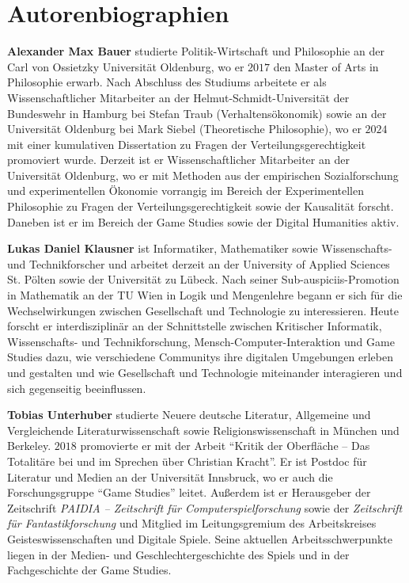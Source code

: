 \documentclass{scrartcl}
\begin{document}
\clearpage
\section*{Autorenbiographien}
\textbf{\textsf{Alexander Max Bauer}} studierte Politik-Wirtschaft und Philosophie an der Carl von Ossietzky Universität Oldenburg, wo er $2017$ den Master of Arts in Philosophie erwarb.
Nach Abschluss des Studiums arbeitete er als Wissenschaftlicher Mitarbeiter an der Helmut-Schmidt-Universität der Bundeswehr in Hamburg bei Stefan Traub (Verhaltensökonomik) sowie an der Universität Oldenburg bei Mark Siebel (Theoretische Philosophie), wo er $2024$ mit einer kumulativen Dissertation zu Fragen der Verteilungsgerechtigkeit promoviert wurde.
Derzeit ist er Wissenschaftlicher Mitarbeiter an der Universität Oldenburg, wo er mit Methoden aus der empirischen Sozialforschung und experimentellen Ökonomie vorrangig im Bereich der Experimentellen Philosophie zu Fragen der Verteilungsgerechtigkeit sowie der Kausalität forscht.
Daneben ist er im Bereich der Game Studies sowie der Digital Humanities aktiv.

\vspace{1em}
\noindent\textbf{\textsf{Lukas Daniel Klausner}} ist Informatiker, Mathematiker sowie Wissenschafts- und Technikforscher und arbeitet derzeit an der University of Applied Sciences St. Pölten sowie der Universität zu Lübeck.
Nach seiner Sub-auspiciis-Promotion in Mathematik an der TU Wien in Logik und Mengenlehre begann er sich für die Wechselwirkungen zwischen Gesellschaft und Technologie zu interessieren.
Heute forscht er interdisziplinär an der Schnittstelle zwischen Kritischer Informatik, Wissenschafts- und Technikforschung, Mensch-Computer-Interaktion und Game Studies dazu, wie verschiedene Communitys ihre digitalen Umgebungen erleben und gestalten und wie Gesellschaft und Technologie miteinander interagieren und sich gegenseitig beeinflussen.

\vspace{1em}
\noindent\textbf{\textsf{Tobias Unterhuber}} studierte Neuere deutsche Literatur, Allgemeine und Vergleichende Literaturwissenschaft sowie Religionswissenschaft in München und Berkeley.
$2018$ promovierte er mit der Arbeit \enquote{Kritik der Oberfläche -- Das Totalitäre bei und im Sprechen über Christian Kracht}.
Er ist Postdoc für Literatur und Medien an der Universität Innsbruck, wo er auch die Forschungsgruppe \enquote{Game Studies} leitet.
Außerdem ist er Herausgeber der Zeitschrift \textit{PAIDIA -- Zeitschrift für Computerspielforschung} sowie der \textit{Zeitschrift für Fantastikforschung} und Mitglied im Leitungsgremium des Arbeitskreises Geisteswissenschaften und Digitale Spiele.
Seine aktuellen Arbeitsschwerpunkte liegen in der Medien- und Geschlechtergeschichte des Spiels und in der Fachgeschichte der Game Studies.
\end{document}
